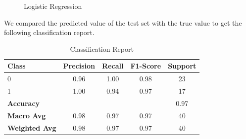 \documentclass{article}
\begin{document}
\begin{figure}[H]
    \centering
    \caption{Logistic Regression}
    \label{fig:example}
\end{figure}

We compared the predicted value of the test set with the true value to get the following classification report.

\begin{table}[h]
\centering
\begin{tabular}{lcccc}
\hline
\textbf{Class} & \textbf{Precision} & \textbf{Recall} & \textbf{F1-Score} & \textbf{Support} \\ \hline
0              & 0.96               & 1.00            & 0.98               & 23               \\
1              & 1.00               & 0.94            & 0.97               & 17               \\ \hline
\textbf{Accuracy}   &                    &                 &                    & 0.97             \\
\textbf{Macro Avg}  & 0.98               & 0.97            & 0.97               & 40               \\
\textbf{Weighted Avg} & 0.98             & 0.97            & 0.97               & 40               \\ \hline
\end{tabular}
\caption{Classification Report}
\label{tab:classification_report}
\end{table}
\end{document}
